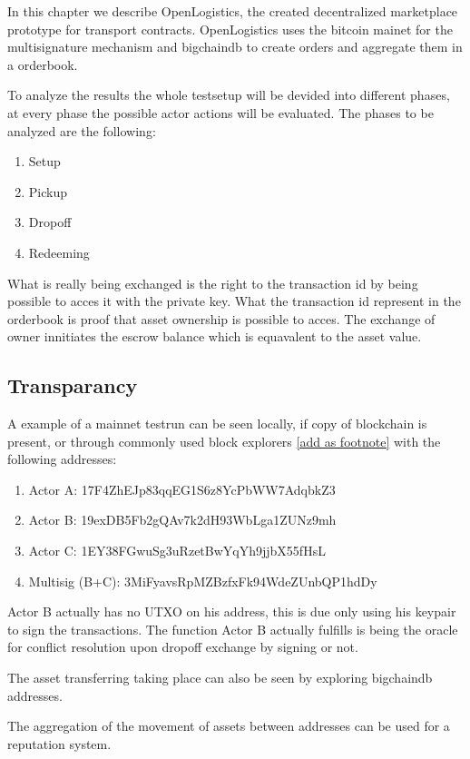 In this chapter we describe OpenLogistics, the created decentralized  marketplace prototype for transport contracts. OpenLogistics uses the bitcoin mainet for the multisignature mechanism and bigchaindb to create orders and aggregate them in a orderbook. \par

To analyze the results the whole testsetup will be devided into different phases, at every phase the possible actor actions will be evaluated. The phases to be analyzed are the following:
\begin{enumerate}
  \item Setup
  \item Pickup
  \item Dropoff
  \item Redeeming
\end{enumerate}

What is really being exchanged is the right to the transaction id by being possible to acces it with the private key. What the transaction id represent in the orderbook is proof that asset ownership is possible to acces. The exchange of owner innitiates the escrow balance which is equavalent to the asset value.

\subsection{Transparancy}

A example of a mainnet testrun can be seen locally, if copy of blockchain is present, or through commonly used block explorers \href{https://www.blocktrail.com/BTC}{[add as footnote]}
 with the following addresses:
\begin{enumerate}
  \item Actor A: 17F4ZhEJp83qqEG1S6z8YcPbWW7AdqbkZ3
  \item Actor B: 19exDB5Fb2gQAv7k2dH93WbLga1ZUNz9mh
  \item Actor C: 1EY38FGwuSg3uRzetBwYqYh9jjbX55fHsL
  \item Multisig (B+C): 3MiFyavsRpMZBzfxFk94WdeZUnbQP1hdDy
\end{enumerate}

Actor B actually has no UTXO on his address, this is due only using his keypair to sign the transactions. The function Actor B actually fulfills is being the oracle for conflict resolution upon dropoff exchange by signing or not.\par
The asset transferring taking place can also be seen by exploring bigchaindb addresses. \par
The aggregation of the movement of assets between addresses can be used for a reputation system.


